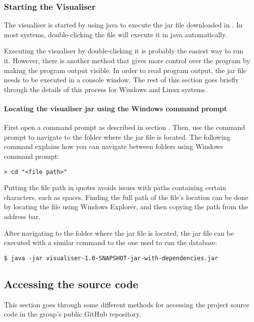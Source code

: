 \documentclass[../document.tex]{subfiles}
\begin{document}
\subsubsection{Starting the Visualiser}
The visualiser is started by using java to execute the jar file downloaded in . In most systems, double-clicking the file will execute it in java automatically.

Executing the visualiser by double-clicking it is probably the easiest way to run it. However, there is another method that gives more control over the program by making the program output visible. In order to read program output, the jar file needs to be executed in a console window. The rest of this section goes briefly through the details of this process for Windows and Linux systems.

\paragraph{Locating the visualiser jar using the Windows command prompt}
First open a command prompt as described in section . Then, use the command prompt to navigate to the folder where the jar file is located. The following command explains how you can navigate between folders using Windows command prompt:
\lstset{style=custombash}
\begin{lstlisting}[caption=Windows command to change current folder]
> cd "<file path>"
\end{lstlisting}
Putting the file path in quotes avoids issues with paths containing certain characters, such as spaces. Finding the full path of the file's location can be done by locating the file using Windows Explorer, and then copying the path from the address bar.

After navigating to the folder where the jar file is located, the jar file can be executed with a similar command to the one used to run the database:
\begin{lstlisting}[caption=Command to execute the visualiser in Java.]
$ java -jar visualiser-1.0-SNAPSHOT-jar-with-dependencies.jar
\end{lstlisting}



\subsection{Accessing the source code}
This section goes through some different methods for accessing the project source code in the group's public GitHub repository.
\end{document}
